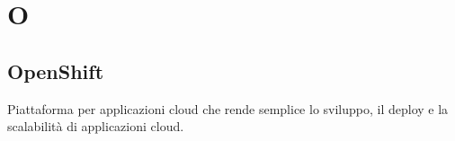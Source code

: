 \section*{O}
\markright{}
\subsection*{OpenShift}
Piattaforma per applicazioni cloud che rende semplice lo sviluppo, il deploy e la scalabilità di applicazioni cloud.